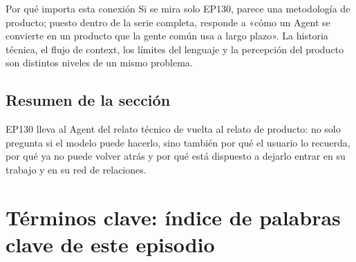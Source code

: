 \documentclass[a4paper]{article}
\begin{document}
\begin{knowledgebox}{Por qué importa esta conexión}
Si se mira solo EP130, parece una metodología de producto; puesto dentro de la serie completa, responde a «cómo un Agent se convierte en un producto que la gente común usa a largo plazo». La historia técnica, el flujo de context, los límites del lenguaje y la percepción del producto son distintos niveles de un mismo problema.
\end{knowledgebox}

\subsection{Resumen de la sección}

EP130 lleva al Agent del relato técnico de vuelta al relato de producto: no solo pregunta si el modelo puede hacerlo, sino también por qué el usuario lo recuerda, por qué ya no puede volver atrás y por qué está dispuesto a dejarlo entrar en su trabajo y en su red de relaciones.
\section{Términos clave: índice de palabras clave de este episodio}
\end{document}
